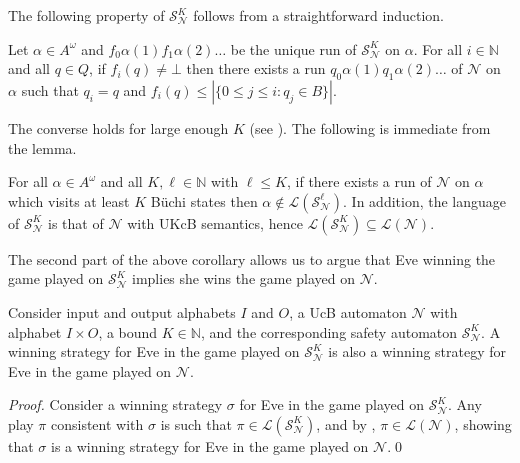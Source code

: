 \documentclass[runningheads,a4paper,draft]{llncs}
\newcommand{\eve}{Eve\xspace}
\newcommand{\calN}{\mathcal{N}}
\newcommand{\calS}{\mathcal{S}}
\renewcommand{\lang}[1]{\mathcal{L}({#1})}
\begin{document}
The following property of $\calS^K_\calN$ follows from a straightforward
induction.
\begin{lemma}\label{lem:runs-visits}
  Let $\alpha \in A^\omega$ and $f_0 \alpha(1) f_1 \alpha(2) \dots$ be the
  unique run of $\calS^K_\calN$ on $\alpha$. For all $i \in \mathbb{N}$ and
  all $q \in Q$, if $f_i(q) \neq \bot$ then there exists a run $q_0
  \alpha(1) q_1 \alpha(2) \dots$ of $\calN$ on $\alpha$ such that $q_i = q$
  and $f_i(q) \leq |\{0 \leq j \leq i : q_j \in B\}|$.
\end{lemma}
%
The converse holds for large enough $K$ (see ).
The following is immediate from the lemma.
%
\begin{corollary}\label{cor:safe-approx}
  For all $\alpha \in A^\omega$ and all $K,\ell \in \mathbb{N}$ with $\ell
  \leq K$, if there exists a run of $\calN$ on $\alpha$ which visits 
  at least $K$ B\"uchi states then $\alpha \not\in \lang{\calS^\ell_\calN}$.
  In addition, the
  language of \(\calS^K_\calN\) is that of \(\calN\) with UKcB semantics,
  hence \(\lang{\calS^K_\calN} \subseteq \lang{\calN}\).
\end{corollary}

The second part of the above corollary allows us to argue that \eve winning
the game played on $\calS^K_\calN$ implies she wins the game played on
$\calN$.
\begin{lemma}\label{lem:safe-to-gen}
    Consider input and output alphabets $I$ and $O$, a UcB
    automaton $\calN$ with alphabet $I \times O$, a bound $K \in \mathbb{N}$,
    and the corresponding safety automaton $\calS^K_\calN$. A
    winning strategy for \eve in the game played on $\calS^K_\calN$
    is also a winning strategy for \eve in the game played on
    $\calN$.
\end{lemma}
\begin{proof}
  Consider a winning strategy \(\sigma\) for \eve in the game played on
  \(\calS^K_\calN\).  Any play \(\pi\) consistent with \(\sigma\) is such that
  \(\pi \in \lang{\calS^K_\calN}\), and by ,
  \(\pi \in \lang{\calN}\), showing that \(\sigma\) is a winning strategy for
  \eve in the game played on \(\calN\).\qed
\end{proof}
\end{document}
